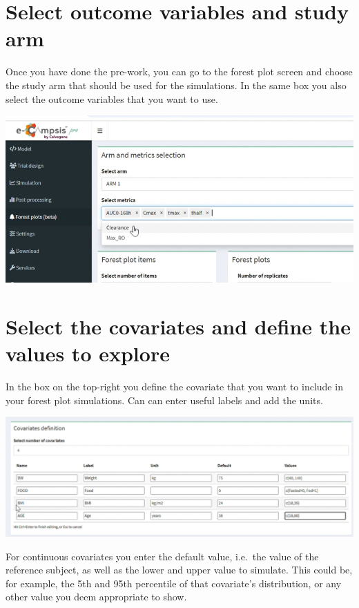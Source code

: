 \documentclass[
]{book}
\begin{document}
\section{Select outcome variables and study arm}\label{select-outcome-variables-and-study-arm}

Once you have done the pre-work, you can go to the forest plot screen and choose the study arm that should be used for the simulations. In the same box you also select the outcome variables that you want to use.

\includegraphics{pictures/forest_plots_arms.png}

\section{Select the covariates and define the values to explore}\label{select-the-covariates-and-define-the-values-to-explore}

In the box on the top-right you define the covariate that you want to include in your forest plot simulations. Can can enter useful labels and add the units.

\includegraphics{pictures/forest_plot_covar_definition.png}

For continuous covariates you enter the default value, i.e.~the value of the reference subject, as well as the lower and upper value to simulate. This could be, for example, the 5th and 95th percentile of that covariate's distribution, or any other value you deem appropriate to show.
\end{document}

